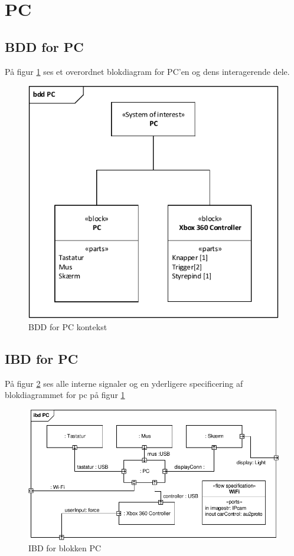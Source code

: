 \section{PC}

\subsection{BDD for PC}

På figur \ref{fig:bdd_pc} ses et overordnet blokdiagram for PC'en og dens interagerende dele. 

\begin{figure}[h]
\centering
\includegraphics[width=\textwidth * 3/4]{../fig/diagrammer/pc/bdd_pc.pdf}
\caption{BDD for PC kontekst}
\label{fig:bdd_pc}
\end{figure}

\clearpage
\subsection{IBD for PC}

På figur \ref{fig:ibd_pc} ses alle interne signaler og en yderligere specificering af blokdiagrammet for pc på figur \ref{fig:bdd_pc}

\begin{figure}[h]
\centering
\includegraphics[width=\textwidth]{../fig/diagrammer/pc/ibd_pc.pdf}
\caption{IBD for blokken PC}
\label{fig:ibd_pc}
\end{figure}

